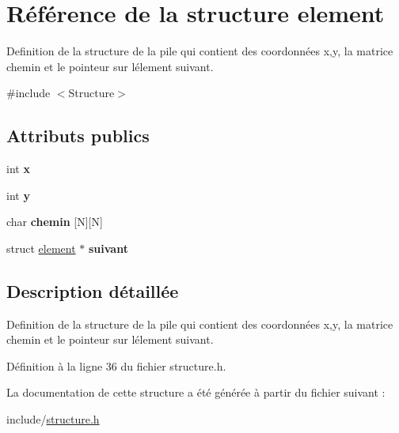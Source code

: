 \hypertarget{structelement}{}\section{Référence de la structure element}
\label{structelement}


Definition de la structure de la pile qui contient des coordonnées x,y, la matrice chemin et le pointeur sur l\textquotesingle{}élement suivant.  




{\ttfamily \#include $<$Structure$>$}

\subsection*{Attributs publics}
\begin{DoxyCompactItemize}
\item 
\hypertarget{structelement_a18e88a462664541872b1018c06289ead}{}int {\bfseries x}\label{structelement_a18e88a462664541872b1018c06289ead}

\item 
\hypertarget{structelement_a434c348427ff30755ba723ab1180d070}{}int {\bfseries y}\label{structelement_a434c348427ff30755ba723ab1180d070}

\item 
\hypertarget{structelement_a6c5d7a8071a7e6410f9a08b72836023a}{}char {\bfseries chemin} \mbox{[}N\mbox{]}\mbox{[}N\mbox{]}\label{structelement_a6c5d7a8071a7e6410f9a08b72836023a}

\item 
\hypertarget{structelement_a4f1534ded1f9373e0843568bf94ea754}{}struct \hyperlink{structelement}{element} $\ast$ {\bfseries suivant}\label{structelement_a4f1534ded1f9373e0843568bf94ea754}

\end{DoxyCompactItemize}


\subsection{Description détaillée}
Definition de la structure de la pile qui contient des coordonnées x,y, la matrice chemin et le pointeur sur l\textquotesingle{}élement suivant. 

Définition à la ligne 36 du fichier structure.\+h.



La documentation de cette structure a été générée à partir du fichier suivant \+:\begin{DoxyCompactItemize}
\item 
include/\hyperlink{structure_8h}{structure.\+h}\end{DoxyCompactItemize}
